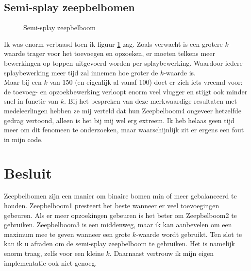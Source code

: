 \documentclass[12pt,hidelinks]{article}
\begin{document}
    \subsection{Semi-splay zeepbelbomen}
    \begin{figure}[H]
        \caption{Semi-splay zeepbelboom}
        \label{figSemi}
    \end{figure}
    Ik was enorm verbaasd toen ik figuur \ref{figSemi} zag. 
    Zoals verwacht is een grotere $k$-waarde trager voor het toevoegen en opzoeken, er moeten telkens meer bewerkingen op toppen uitgevoerd worden per splaybewerking.
    Waardoor iedere splaybewerking meer tijd zal innemen hoe groter de $k$-waarde is.
    \\
    Maar bij een $k$ van 150 (en eigenlijk al vanaf 100) doet er zich iets vreemd voor: de toevoeg- en opzoekbewerking verloopt enorm veel vlugger en stijgt ook minder snel in functie van $k$.
    Bij het bespreken van deze merkwaardige resultaten met medeleerlingen hebben ze mij verteld dat hun Zeepbelboom4 ongeveer hetzelfde gedrag vertoond, alleen is het bij mij wel erg extreem.
    Ik heb helaas geen tijd meer om dit fenomeen te onderzoeken, maar waarschijnlijk zit er ergens een fout in mijn code.
    \section{Besluit}
    Zeepbelbomen zijn een manier om binaire bomen min of meer gebalanceerd te houden. Zeepbelboom1 presteert het beste wanneer er veel toevoegingen gebeuren.
    Als er meer opzoekingen gebeuren is het beter om Zeepbelboom2 te gebruiken.
    Zeepbelboom3 is een middenweg, maar ik kan aanbevelen om een maximum mee te geven wanneer een grote $k$-waarde wordt gebruikt.
    Ten slot te kan ik u afraden om de semi-splay zeepbelboom te gebruiken. Het is namelijk enorm traag, zelfs voor een kleine $k$. Daarnaast vertrouw ik mijn eigen implementatie ook niet genoeg.
    
\end{document}
